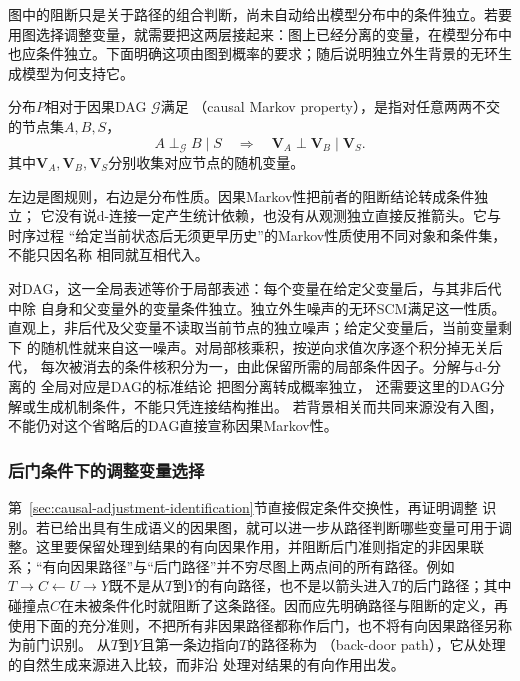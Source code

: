 图中的阻断只是关于路径的组合判断，尚未自动给出模型分布中的条件独立。若要用图选择调整变量，就需要把这两层接起来：图上已经分离的变量，在模型分布中也应条件独立。下面明确这项由图到概率的要求；随后说明独立外生背景的无环生成模型为何支持它。
\begin{definition}[因果Markov性]
  \label{def:causal-markov-property}
  分布\(P\)相对于因果DAG \(\mathcal G\)满足
  （causal Markov property），是指对任意两两不交的节点集\(A,B,S\)，
  \[
    A\perp_{\mathcal G}B\mid S
    \quad\Longrightarrow\quad
    \bm V_A\perp\bm V_B\mid\bm V_S.
  \]
  其中\(\bm V_A,\bm V_B,\bm V_S\)分别收集对应节点的随机变量。
\end{definition}

左边是图规则，右边是分布性质。因果Markov性把前者的阻断结论转成条件独立；
它没有说d-连接一定产生统计依赖，也没有从观测独立直接反推箭头。它与时序过程
“给定当前状态后无须更早历史”的Markov性质使用不同对象和条件集，不能只因名称
相同就互相代入。

对DAG，这一全局表述等价于局部表述：每个变量在给定父变量后，与其非后代中除
自身和父变量外的变量条件独立。独立外生噪声的无环SCM满足这一性质。
直观上，非后代及父变量不读取当前节点的独立噪声；给定父变量后，当前变量剩下
的随机性就来自这一噪声。对局部核乘积，按逆向求值次序逐个积分掉无关后代，
每次被消去的条件核积分为一，由此保留所需的局部条件因子。分解与d-分离的
全局对应是DAG的标准结论
把图分离转成概率独立，
还需要这里的DAG分解或生成机制条件，不能只凭连接结构推出。
若背景相关而共同来源没有入图，不能仍对这个省略后的DAG直接宣称因果Markov性。

\subsubsection{后门条件下的调整变量选择}
\label{sec:causal-backdoor-selection}

第~\ref{sec:causal-adjustment-identification}节直接假定条件交换性，再证明调整
识别。若已给出具有生成语义的因果图，就可以进一步从路径判断哪些变量可用于调整。这里要保留处理到结果的有向因果作用，并阻断后门准则指定的非因果联系；“有向因果路径”与“后门路径”并不穷尽图上两点间的所有路径。例如\(T\to C\leftarrow U\to Y\)既不是从\(T\)到\(Y\)的有向路径，也不是以箭头进入\(T\)的后门路径；其中碰撞点\(C\)在未被条件化时就阻断了这条路径。因而应先明确路径与阻断的定义，再使用下面的充分准则，不把所有非因果路径都称作后门，也不将有向因果路径另称为前门识别。
从\(T\)到\(Y\)且第一条边指向\(T\)的路径称为
（back-door path），它从处理的自然生成来源进入比较，而非沿
处理对结果的有向作用出发。

